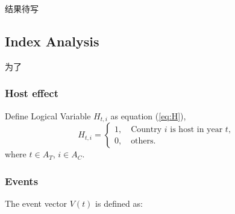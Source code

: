 \documentclass{mcmthesis}
\begin{document}
结果待写


















\subsection{Index Analysis}
为了
\subsubsection{Host effect}

Define Logical Variable $H_{t,i}$ as equation (\ref{eq:H}),
\begin{equation}
	H_{t,i}=
	\begin{cases}
		1, \quad \text{Country } i \text{ is host in year } t, \\
		0, \quad \text{others}.
	\end{cases}
	\label{eq:H}
\end{equation}
where $t\in A_{T}$, $i\in A_{C}$.



\subsubsection{Events}
The event vector \( V(t) \) is defined as:
\end{document}
